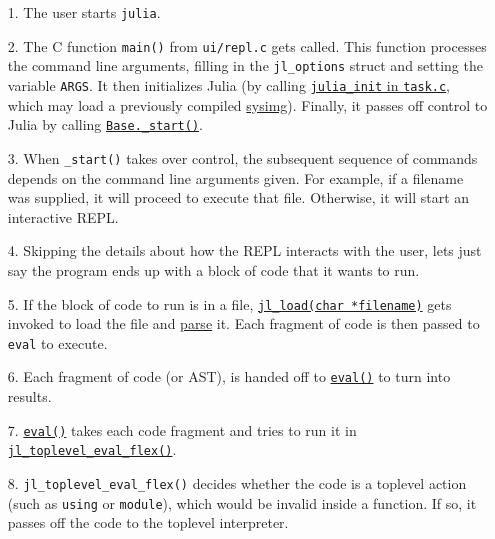 \begin{itemize}
\item[1.  ] The user starts \texttt{julia}.


\item[2.  ] The C function \texttt{main()} from \texttt{ui/repl.c} gets called. This function processes the command line arguments, filling in the \texttt{jl\_options} struct and setting the variable \texttt{ARGS}. It then initializes Julia (by calling \href{https://github.com/JuliaLang/julia/blob/master/src/task.c}{\texttt{julia\_init} in \texttt{task.c}}, which may load a previously compiled \hyperlink{6082338945993475185}{sysimg}). Finally, it passes off control to Julia by calling \href{https://github.com/JuliaLang/julia/blob/master/base/client.jl}{\texttt{Base.\_start()}}.


\item[3.  ] When \texttt{\_start()} takes over control, the subsequent sequence of commands depends on the command line arguments given. For example, if a filename was supplied, it will proceed to execute that file. Otherwise, it will start an interactive REPL.


\item[4.  ] Skipping the details about how the REPL interacts with the user, let{\textquotesingle}s just say the program ends up with a block of code that it wants to run.


\item[5.  ] If the block of code to run is in a file, \href{https://github.com/JuliaLang/julia/blob/master/src/toplevel.c}{\texttt{jl\_load(char *filename)}} gets invoked to load the file and \hyperlink{14838640034628506824}{parse} it. Each fragment of code is then passed to \texttt{eval} to execute.


\item[6.  ] Each fragment of code (or AST), is handed off to \hyperlink{7507639810592563424}{\texttt{eval()}} to turn into results.


\item[7.  ] \hyperlink{7507639810592563424}{\texttt{eval()}} takes each code fragment and tries to run it in \href{https://github.com/JuliaLang/julia/blob/master/src/toplevel.c}{\texttt{jl\_toplevel\_eval\_flex()}}.


\item[8.  ] \texttt{jl\_toplevel\_eval\_flex()} decides whether the code is a {\textquotedbl}toplevel{\textquotedbl} action (such as \texttt{using} or \texttt{module}), which would be invalid inside a function. If so, it passes off the code to the toplevel interpreter.



\end{itemize}
